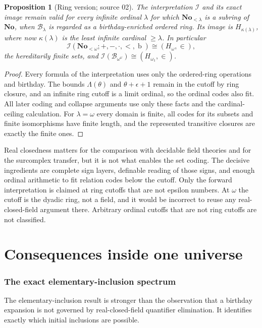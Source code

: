 \documentclass[11pt,letterpaper]{article}
\newtheorem{proposition}[proposition]{Proposition}\aliascntresetthe{proposition}
\theoremstyle{definition}
\theoremstyle{remark}
\newcommand{\No}{\mathbf{No}}
\newcommand{\bd}{\operatorname{b}}
\newcommand{\B}{\mathcal B}
\newcommand{\I}{\mathcal I}
\begin{document}
\begin{proposition}[Ring version; source 02]\label{hset:prop:ring}
The interpretation $\I$ and its exact image remain valid for every infinite
ordinal $\lambda$ for which $\No_{<\lambda}$ is a subring of $\No$, when
$\B_\lambda$ is regarded as a birthday-enriched ordered ring. Its image is
$H_{\kappa(\lambda)}$, where now $\kappa(\lambda)$ is the least \emph{infinite}
cardinal $\ge\lambda$. In particular
\[
 \I(\No_{<\omega};+,-,\cdot,<,\bd)\cong(H_\omega,\in),
\]
the hereditarily finite sets, and $\I(\B_{\omega^\omega})\cong(H_{\omega_1},\in)$.
\end{proposition}
\begin{proof}
Every formula of the interpretation uses only the ordered-ring operations and
birthday. The bounds $\Lambda(\theta)$ and $\theta+\epsilon+1$ remain in the
cutoff by ring closure, and an infinite ring cutoff is a limit ordinal, so the
ordinal codes also fit. All later coding and collapse arguments use only these
facts and the cardinal-ceiling calculation. For $\lambda=\omega$ every domain is
finite, all codes for its subsets and finite isomorphisms have finite length,
and the represented transitive closures are exactly the finite ones.
\end{proof}

Real closedness matters for the comparison with decidable field theories and
for the surcomplex transfer, but it is not what enables the set coding. The
decisive ingredients are complete sign layers, definable reading of those
signs, and enough ordinal arithmetic to fit relation codes below the cutoff.
Only the forward interpretation is claimed at ring cutoffs that are not epsilon
numbers. At $\omega$ the cutoff is the dyadic ring, not a field, and it would
be incorrect to reuse any real-closed-field argument there. Arbitrary ordinal
cutoffs that are not ring cutoffs are not classified.

\part{Consequences inside one universe}\label{hset:part:inside}

\section{The exact elementary-inclusion spectrum}
\label{hset:sec:elementary}

The elementary-inclusion result is stronger than the observation that a
birthday expansion is not governed by real-closed-field quantifier
elimination. It identifies exactly which initial inclusions are possible.
\end{document}
